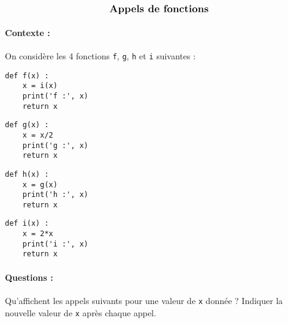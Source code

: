 \documentclass[11pt,a4paper]{article}
\begin{document}
\entete



$$\mbox{\textbf{\large Appels de fonctions}}$$

\paragraph{Contexte :}
On considère les 4 fonctions \texttt{f}, \texttt{g}, \texttt{h} et \texttt{i} suivantes :\vspace*{2mm}

\noindent\begin{minipage}{3.5cm}\footnotesize
\begin{Verbatim}
def f(x) :
    x = i(x)
    print('f :', x)
    return x
\end{Verbatim}
\end{minipage}
\hfill
\begin{minipage}{3.5cm}\footnotesize
\begin{Verbatim}
def g(x) :
    x = x/2
    print('g :', x)
    return x
\end{Verbatim}
\end{minipage}
\hfill
\begin{minipage}{3.5cm}\footnotesize
\begin{Verbatim}
def h(x) :
    x = g(x)
    print('h :', x)
    return x
\end{Verbatim}
\end{minipage}
\hfill
\begin{minipage}{3.5cm}\footnotesize
\begin{Verbatim}
def i(x) :
    x = 2*x
    print('i :', x)
    return x
\end{Verbatim}
\end{minipage}

\paragraph{Questions :}
Qu'affichent les appels suivants pour une valeur de \texttt{x} donnée ? 
Indiquer la nouvelle valeur de \texttt{x} après chaque appel.
\vspace*{3mm}
\end{document}
